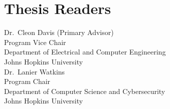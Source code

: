 %
\lipsum[1-4]
%
\section*{Thesis Readers}
\begin{singlespace}
%
\noindent Dr.~Cleon Davis (Primary Advisor)\\
\indent \indent Program Vice Chair\\
\indent \indent Department of Electrical and Computer Engineering\\
\indent \indent Johns Hopkins University\\

\noindent Dr.~Lanier Watkins\\
\indent \indent Program Chair\\
\indent \indent Department of Computer Science and Cybersecurity\\
\indent \indent Johns Hopkins University\\
%
%
\end{singlespace}